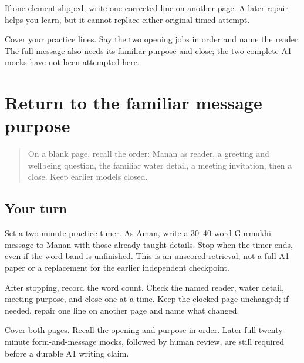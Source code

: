 If one element slipped, write one corrected line on another page. A later repair helps you learn, but it cannot replace either original timed attempt.

\begin{tcolorbox}[breakable,colback=teal!4,colframe=teal!35!black,title={Before you move on}]
Cover your practice lines. Say the two opening jobs in order and name the reader. The full message also needs its familiar purpose and close; the two complete A1 mocks have not been attempted here.
\end{tcolorbox}
\section[(known water detail and meeting purpose)]{Return to the familiar message purpose}

\label{lesson:PA-W13-message-purpose-return}



\begin{quote}
On a blank page, recall the order: Manan as reader, a greeting and wellbeing question, the familiar water detail, a meeting invitation, then a close. Keep earlier models closed.
\end{quote}

\subsection*{Your turn}
Set a two-minute practice timer. As Aman, write a 30–40-word Gurmukhi message to Manan with those already taught details. Stop when the timer ends, even if the word band is unfinished. This is an unscored retrieval, not a full A1 paper or a replacement for the earlier independent checkpoint.

After stopping, record the word count. Check the named reader, water detail, meeting purpose, and close one at a time. Keep the clocked page unchanged; if needed, repair one line on another page and name what changed.

\begin{tcolorbox}[breakable,colback=teal!4,colframe=teal!35!black,title={Before you move on}]
Cover both pages. Recall the opening and purpose in order. Later full twenty-minute form-and-message mocks, followed by human review, are still required before a durable A1 writing claim.
\end{tcolorbox}
